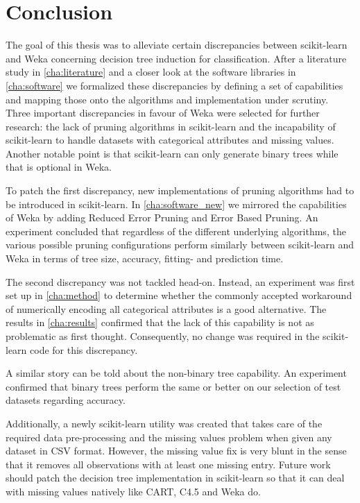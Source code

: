 \chapter{Conclusion}\label{cha:conclusion}
The goal of this thesis was to alleviate certain discrepancies between scikit-learn and Weka concerning decision tree induction for classification. After a literature study in \autoref{cha:literature} and a closer look at the software libraries in \autoref{cha:software} we formalized these discrepancies by defining a set of capabilities and mapping those onto the algorithms and implementation under scrutiny. Three important discrepancies in favour of Weka were selected for further research: the lack of pruning algorithms in scikit-learn and the incapability of scikit-learn to handle datasets with categorical attributes and missing values. Another notable point is that scikit-learn can only generate binary trees while that is optional in Weka.

To patch the first discrepancy, new implementations of pruning algorithms had to be introduced in scikit-learn. In \autoref{cha:software_new} we mirrored the capabilities of Weka by adding Reduced Error Pruning and Error Based Pruning. An experiment concluded that regardless of the different underlying algorithms, the various possible pruning configurations perform similarly between scikit-learn and Weka in terms of tree size, accuracy, fitting- and prediction time.

The second discrepancy was not tackled head-on. Instead, an experiment was first set up in \autoref{cha:method} to determine whether the commonly accepted workaround of numerically encoding all categorical attributes is a good alternative. The results in \autoref{cha:results} confirmed that the lack of this capability is not as problematic as first thought. Consequently, no change was required in the scikit-learn code for this discrepancy.

A similar story can be told about the non-binary tree capability. An experiment confirmed that binary trees perform the same or better on our selection of test datasets regarding accuracy.

Additionally, a newly scikit-learn utility was created that takes care of the required data pre-processing and the missing values problem when given any dataset in CSV format. However, the missing value fix is very blunt in the sense that it removes all observations with at least one missing entry. Future work should patch the decision tree implementation in scikit-learn so that it can deal with missing values natively like CART, C4.5 and Weka do.

